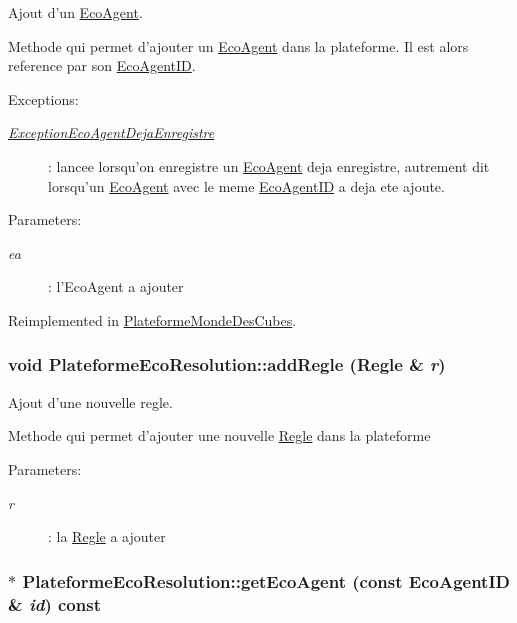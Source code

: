 Ajout d'un \hyperlink{classEcoAgent}{EcoAgent}. 

Methode qui permet d'ajouter un \hyperlink{classEcoAgent}{EcoAgent} dans la plateforme. Il est alors reference par son \hyperlink{classEcoAgentID}{EcoAgentID}. \begin{Desc}
\item[Exceptions:]
\begin{description}
\item[{\em \hyperlink{classExceptionEcoAgentDejaEnregistre}{ExceptionEcoAgentDejaEnregistre}}]: lancee lorsqu'on enregistre un \hyperlink{classEcoAgent}{EcoAgent} deja enregistre, autrement dit lorsqu'un \hyperlink{classEcoAgent}{EcoAgent} avec le meme \hyperlink{classEcoAgentID}{EcoAgentID} a deja ete ajoute. \end{description}
\end{Desc}
\begin{Desc}
\item[Parameters:]
\begin{description}
\item[{\em ea}]: l'EcoAgent a ajouter \end{description}
\end{Desc}


Reimplemented in \hyperlink{classPlateformeMondeDesCubes_6fb5b9ececb0e7893b2c7ff5531cb3b1}{PlateformeMondeDesCubes}.\hypertarget{classPlateformeEcoResolution_c2978a0e31b186415ca156a19ac8a1dc}{
\subsubsection[{addRegle}]{\setlength{\rightskip}{0pt plus 5cm}void PlateformeEcoResolution::addRegle ({\bf Regle} \& {\em r})}}
\label{classPlateformeEcoResolution_c2978a0e31b186415ca156a19ac8a1dc}


Ajout d'une nouvelle regle. 

Methode qui permet d'ajouter une nouvelle \hyperlink{classRegle}{Regle} dans la plateforme

\begin{Desc}
\item[Parameters:]
\begin{description}
\item[{\em r}]: la \hyperlink{classRegle}{Regle} a ajouter \end{description}
\end{Desc}
\hypertarget{classPlateformeEcoResolution_acd4e2899f178261ddd0fde086932e84}{
\subsubsection[{getEcoAgent}]{ $\ast$ PlateformeEcoResolution::getEcoAgent (const {\bf EcoAgentID} \& {\em id}) const}}
\label{classPlateformeEcoResolution_acd4e2899f178261ddd0fde086932e84}


